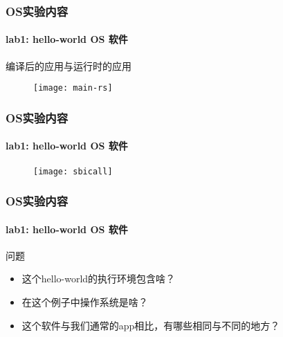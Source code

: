 \begin{frame}
    \frametitle{OS实验内容}
    \framesubtitle{lab1: hello-world OS  软件}
    
    编译后的应用与运行时的应用
    \begin{figure}
        \centering
        \texttt{[image: main-rs]} %
    \end{figure}
\end{frame}


\begin{frame}
    \frametitle{OS实验内容}
    \framesubtitle{lab1: hello-world OS  软件}
    
    \begin{figure}
        \centering
        \texttt{[image: sbicall]} %
    \end{figure}
\end{frame}


\begin{frame}
    \frametitle{OS实验内容}
    \framesubtitle{lab1: hello-world OS  软件}
    问题
        \begin{itemize}
            \item 这个hello-world的执行环境包含啥？
            \item 在这个例子中操作系统是啥？
            \item 这个软件与我们通常的app相比，有哪些相同与不同的地方？
        \end{itemize}
     

\end{frame}

